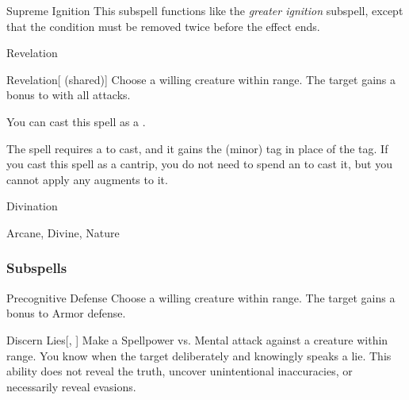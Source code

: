 \begin{ability}[\nth{9}]{Supreme Ignition}
This subspell functions like the \textit{greater ignition} subspell, except that the condition must be removed twice before the effect ends.
\end{ability}
\vspace{0.25em}

\newpage
\begin{spellsection}{Revelation}

\begin{spellheader}
\end{spellheader}


\begin{ability}{Revelation}[ (shared)]
Choose a willing creature within \rngclose range.
The target gains a  bonus to  with all attacks.

You can cast this spell as a .
\end{ability}



 The spell requires a  to cast, and it gains the  (minor) tag in place of the  tag. If you cast this spell as a cantrip,
you do not need to spend an  to cast it,
but you cannot apply any augments to it.


 Divination

 Arcane, Divine, Nature
\end{spellsection}


\subsubsection{Subspells}


\begin{ability}[\nth{1}]{Precognitive Defense}
Choose a willing creature within \rngclose range.
The target gains a  bonus to Armor defense.
\end{ability}
\vspace{0.25em}


\begin{ability}[\nth{2}]{Discern Lies}[, ]
Make a Spellpower vs. Mental attack against a creature within \rngmed range.
\hit You know when the target deliberately and knowingly speaks a lie.
This ability does not reveal the truth, uncover unintentional inaccuracies, or necessarily reveal evasions.
\end{ability}
\vspace{0.25em}


